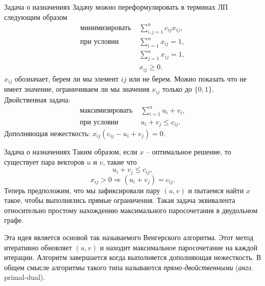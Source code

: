\documentclass[10pt]{beamer}
\begin{document}
\begin{frame}{Задача о назначениях}
Задачу можно переформулировать в терминах ЛП следующим образом
$$
\begin{array}{ll}
\mbox{минимизировать } & \sum_{i,j=1}^nc_{ij}x_{ij},\\
\mbox{при условии }    & \sum_{i=1}^nx_{ij}=1,\\
					   & \sum_{j=1}^nx_{ij}=1,\\
					   & x_{ij}\geq 0.
\end{array}
$$
$x_{ij}$ обозначает, берем ли мы элемент $ij$ или не берем. Можно показать что не имеет значение, ограничиваем ли мы значения $x_{ij}$ только до $\{0,1\}$.\\
Двойственная задача:
$$
\begin{array}{ll}
\mbox{максимизировать } & \sum_{i=1}^nu_i+v_i,\\
\mbox{при условии }    & u_i+v_j\leq c_{ij}.
\end{array}
$$
Дополняющая нежесткость: $x_{ij}(c_{ij}-u_i+v_j)=0$.
\end{frame}

\begin{frame}{Задача о назначениях}
Таким образом, если $x$ -- оптимальное решение, то существует пара векторов $u$ и $v$, такие что
$$
u_i+v_j\leq c_{ij},
$$
$$
x_{ij}>0\Rightarrow (u_i+v_j)=c_{ij}.
$$
Теперь предположим, что мы зафиксировали пару $(u,v)$ и пытаемся найти $x$ такое, чтобы выполнялись прямые ограничения. Такая задача эквивалента относительно простому нахождению максимального паросочетания в двудольном графе.
\vspace{2em}

Эта идея является основой так называемого Венгерского алгоритма. Этот метод итеративно обновляет $(u,v)$ и находит максимальное паросочетание на каждой итерации. Алгоритм завершается когда выполняется дополняющая нежесткость. В общем смысле алгоритмы такого типа называются \textit{прямо-двойственными} (\textit{англ.} primal-dual). 
\end{frame}
\end{document}
